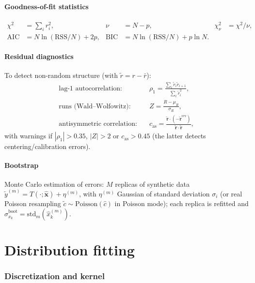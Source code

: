 \documentclass[11pt,a4paper]{article}
\begin{document}
\subsection{Goodness-of-fit statistics}
\begin{align}
  \chi^2 &= \sum_i r_i^2, & \nu&=N-p, & \chi^2_\nu&=\chi^2/\nu,\\
  \mathrm{AIC}&=N\ln(\mathrm{RSS}/N)+2p, & \mathrm{BIC}&=N\ln(\mathrm{RSS}/N)+p\ln N.
\end{align}

\subsection{Residual diagnostics}
To detect non-random structure (with $\tilde r=r-\bar r$):
\begin{align}
  \text{lag-1 autocorrelation:}\quad &\rho_1=\frac{\sum_i\tilde r_i\tilde r_{i+1}}{\sum_i\tilde r_i^2},\\
  \text{runs (Wald–Wolfowitz):}\quad &Z=\frac{R-\mu_R}{\sigma_R},\\
  \text{antisymmetric correlation:}\quad &c_{\text{as}}=\frac{\tilde{\bm r}\cdot(-\tilde{\bm r}^{\text{rev}})}{\tilde{\bm r}\cdot\tilde{\bm r}},
\end{align}
with warnings if $|\rho_1|>0.35$, $|Z|>2$ or $c_{\text{as}}>0.45$ (the latter
detects centering/calibration errors).

\subsection{Bootstrap}
Monte Carlo estimation of errors: $M$ replicas of synthetic data
$\tilde y^{(m)}=T(\cdot;\hat{\bm x})+\eta^{(m)}$, with $\eta^{(m)}$ Gaussian of
standard deviation $\sigma_i$ (or real Poisson resampling
$\tilde c\sim\mathrm{Poisson}(\hat c)$ in Poisson mode); each replica is refitted and
$\hat\sigma_{x_k}^{\text{boot}}=\mathrm{std}_m(\hat x_k^{(m)})$.

\part{Distribution fitting}

\section{Discretization and kernel}\label{sec:dist-kernel}
\end{document}
